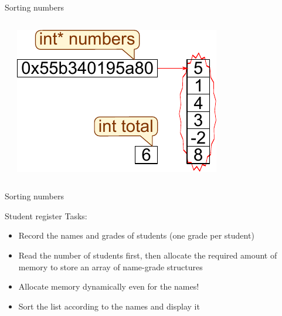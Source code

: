\documentclass[usenames,dvipsnames,aspectratio=169]{beamer}
\begin{document}
\begin{frame}{Sorting numbers}
  \begin{columns}[T]
      \begin{exampleblock}{}
        
      \end{exampleblock}    
    \begin{center}
      \includegraphics{bubble6.pdf}
    \end{center}
  \end{columns}
\end{frame}

\begin{frame}{Sorting numbers}
  \footnotesize
  \begin{exampleblock}{}
    
  \end{exampleblock}
\end{frame}

\begin{frame}{Student register}
  Tasks:
  \begin{itemize}
    \item Record the names and grades of students (one grade per student)
    \item Read the number of students first, then allocate the required amount of memory to store an array of name-grade structures
    \item Allocate memory dynamically even for the names!
    \item Sort the list according to the names and display it
  \end{itemize}
\end{frame}
\end{document}

